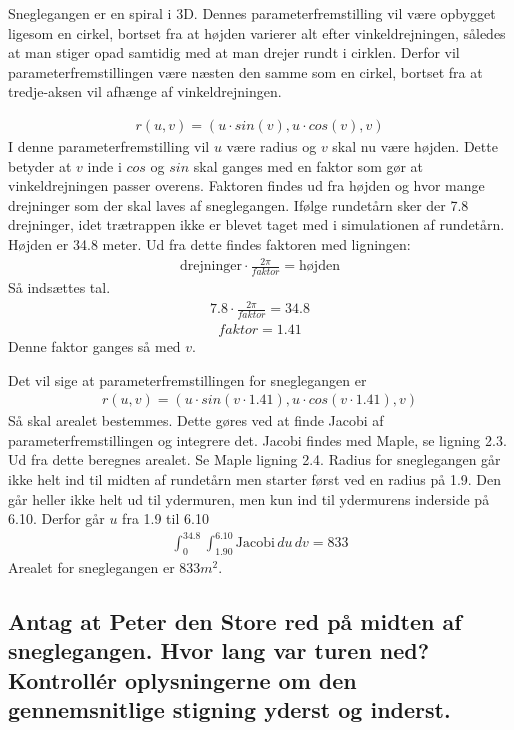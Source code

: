 Sneglegangen er en spiral i 3D. Dennes parameterfremstilling vil være opbygget ligesom en cirkel, bortset fra at højden varierer alt efter vinkeldrejningen, således at man stiger opad samtidig med at man drejer rundt i cirklen. Derfor vil parameterfremstillingen være næsten den samme som en cirkel, bortset fra at tredje-aksen vil afhænge af vinkeldrejningen.

\begin{align}
    r(u,v) = (u \cdot sin(v),u \cdot cos(v),v)
\end{align}
I denne parameterfremstilling vil $u$ være radius og $v$ skal nu være højden. Dette betyder at $v$ inde i $cos$ og $sin$ skal ganges med en faktor som gør at vinkeldrejningen passer overens. Faktoren findes ud fra højden og hvor mange drejninger som der skal laves af sneglegangen. Ifølge rundetårn sker der 7.8 drejninger, idet trætrappen ikke er blevet taget med i simulationen af rundetårn. Højden er 34.8 meter.
Ud fra dette findes faktoren med ligningen:
\begin{align}
    \text{drejninger} \cdot \frac{2 \pi}{faktor} = \text{højden}
\end{align}
Så indsættes tal.
\begin{align}
    7.8 \cdot \frac{2 \pi}{faktor} = 34.8 
\end{align}
\begin{align}
    faktor = 1.41 
\end{align}
Denne faktor ganges så med $v$. 

Det vil sige at parameterfremstillingen for sneglegangen er
\begin{align}
    r(u,v) = (u \cdot sin(v \cdot 1.41),u \cdot cos(v \cdot 1.41),v) 
\end{align}
Så skal arealet bestemmes. Dette gøres ved at finde Jacobi af parameterfremstillingen og integrere det. Jacobi findes med Maple, se ligning 2.3. 
Ud fra dette beregnes arealet. Se Maple ligning 2.4.
Radius for sneglegangen går ikke helt ind til midten af rundetårn men starter først ved en radius på 1.9. Den går heller ikke helt ud til ydermuren, men kun ind til ydermurens inderside på 6.10. Derfor går $u$ fra 1.9 til 6.10
\begin{align}
    \int^{34.8}_{0} \int^{6.10}_{1.90} \text{Jacobi} \,du \,dv = 833
\end{align}
Arealet for sneglegangen er $833 m^2$.

\subsection{Antag at Peter den Store red på midten af sneglegangen. Hvor lang var turen ned? Kontrollér oplysningerne om den gennemsnitlige stigning yderst og inderst.}

